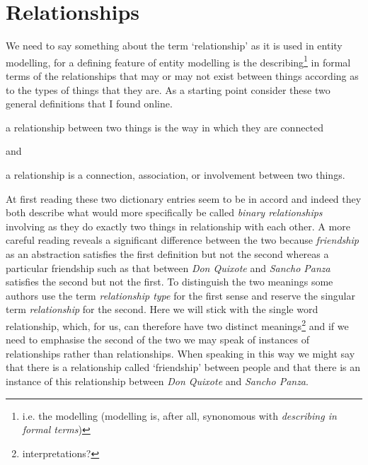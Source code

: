
\section{Relationships}
\label{Relationships}
\mynote
We need to say something about the term `relationship' as it is used in
entity modelling, for a defining feature of entity modelling is the describing\footnote{i.e. the modelling (modelling is, after all,  synonomous with \textit{describing in formal terms})}
in formal terms  of the relationships that may or may not  exist between things according as to the types of things that they are. 
\mynote 
As a starting point consider these two general definitions that I found online. 
\begin{erquote}
a relationship between two things is the way in which they are connected
\end{erquote}
and 
\begin{erquote}
a relationship is a connection, association, or involvement between two things.
\end{erquote}

At first reading these two dictionary entries seem to be in accord and indeed 
they both describe what would more specifically be called \textit{binary relationships} involving as they do exactly two things in relationship with each other.
A more careful reading reveals a significant difference between the two because \textit{friendship} as an abstraction satisfies the first definition but not the second whereas a particular friendship such as that between \textit{Don Quixote} and \textit{Sancho Panza} satisfies the second  but not the first. 
To distinguish the two meanings some authors use the term \textit{relationship type} for the first sense and reserve the singular term \textit{relationship}  for the second. Here we will stick with the single word relationship, which, for us, can therefore have two distinct meanings\footnote{interpretations?} and if we need to emphasise the second of the two we may speak of instances of relationships rather than relationships. When speaking in this way we might say that there is a relationship called `friendship' between people and that there is an instance of this relationship between \textit{Don Quixote} and \textit{Sancho Panza}.

